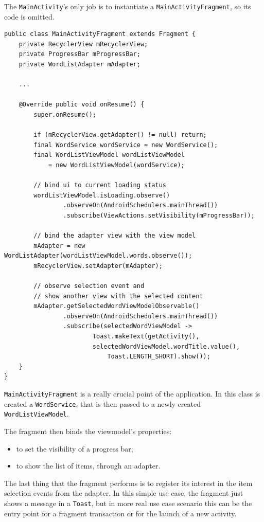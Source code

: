 The \texttt{MainActivity}'s only job is to instantiate a
\texttt{MainActivityFragment}, so its code is omitted.

\begin{verbatim}
public class MainActivityFragment extends Fragment {
    private RecyclerView mRecyclerView;
    private ProgressBar mProgressBar;
    private WordListAdapter mAdapter;

    ...

    @Override public void onResume() {
        super.onResume();

        if (mRecyclerView.getAdapter() != null) return; 
        final WordService wordService = new WordService();
        final WordListViewModel wordListViewModel 
        	= new WordListViewModel(wordService);

        // bind ui to current loading status
        wordListViewModel.isLoading.observe()
                .observeOn(AndroidSchedulers.mainThread())
                .subscribe(ViewActions.setVisibility(mProgressBar));

        // bind the adapter view with the view model
        mAdapter = new WordListAdapter(wordListViewModel.words.observe());
        mRecyclerView.setAdapter(mAdapter);

        // observe selection event and 
        // show another view with the selected content
        mAdapter.getSelectedWordViewModelObservable()
                .observeOn(AndroidSchedulers.mainThread())
                .subscribe(selectedWordViewModel ->
                        Toast.makeText(getActivity(),
                        selectedWordViewModel.wordTitle.value(), 
                        	Toast.LENGTH_SHORT).show());
    }
}
\end{verbatim}

\texttt{MainActivityFragment} is a really crucial point of the
application. In this class is created a \texttt{WordService}, that is
then passed to a newly created \texttt{WordListViewModel}.

The fragment then binds the viewmodel's properties:

\begin{itemize}
\itemsep1pt\parskip0pt
\item
  to set the visibility of a progress bar;
\item
  to show the list of items, through an adapter.
\end{itemize}

The last thing that the fragment performs is to register its interest
in the item selection events from the adapter. In this simple use case,
the fragment just shows a message in a \texttt{Toast}, but in more real
use case scenario this can be the entry point for a fragment transaction
or for the launch of a new activity.

